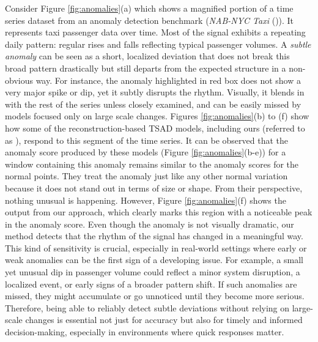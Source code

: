Consider Figure \ref{fig:anomalies}(a) which shows a magnified portion of a time series dataset from an anomaly detection benchmark (\emph{NAB-NYC Taxi} (\cite{b2})). It represents taxi passenger data over time. Most of the signal exhibits a repeating daily pattern: regular rises and falls reflecting typical passenger volumes. A \emph{subtle anomaly} can be seen as a short, localized deviation that does not break this broad pattern drastically but still departs from the expected structure in a non-obvious way. For instance, the anomaly highlighted in red box does not show a very major spike or dip, yet it subtly disrupts the rhythm. Visually, it blends in with the rest of the series unless closely examined, and can be easily missed by models focused only on large scale changes. 
Figures \ref{fig:anomalies}(b) to (f) show how some of the reconstruction-based TSAD models, including ours (referred to as \fname{}), respond to this segment of the time series.
It can be observed that the anomaly score produced by these models (Figure \ref{fig:anomalies}(b-e)) for a window containing this anomaly remains similar to the anomaly scores for the normal points. They treat the anomaly just like any other normal variation because it does not stand out in terms of size or shape. From their perspective, nothing unusual is happening. However, Figure \ref{fig:anomalies}(f) shows the output from our approach, which clearly marks this region with a noticeable peak in the anomaly score. Even though the anomaly is not visually dramatic, our method detects that the rhythm of the signal has changed in a meaningful way. This kind of sensitivity is crucial, especially in real-world settings where early or weak anomalies can be the first sign of a developing issue. For example, a small yet unusual dip in passenger volume could reflect a minor system disruption, a localized event, or early signs of a broader pattern shift. If such anomalies are missed, they might accumulate or go unnoticed until they become more serious. Therefore, being able to reliably detect subtle deviations without relying on large-scale changes is essential not just for accuracy but also for timely and informed decision-making, especially in environments where quick responses matter.\\
